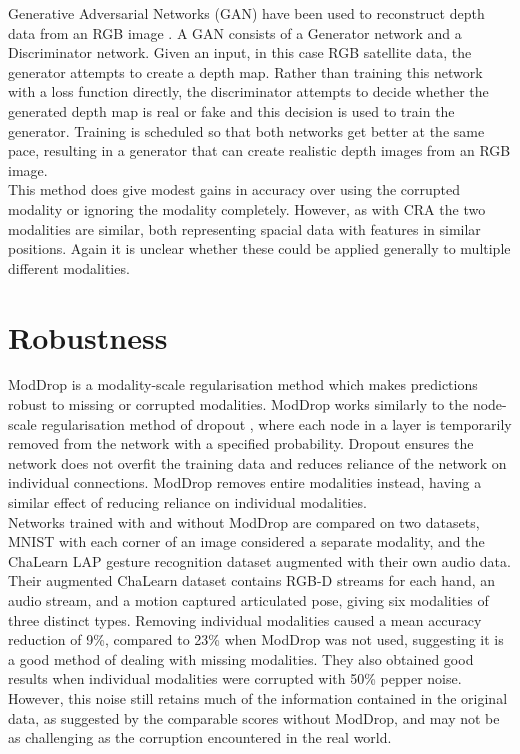 Generative Adversarial Networks (GAN) have been used to reconstruct depth data from an RGB image \cite{GANFootprint}. A GAN consists of a Generator network and a Discriminator network. Given an input, in this case RGB satellite data, the generator attempts to create a depth map. Rather than training this network with a loss function directly, the discriminator attempts to decide whether the generated depth map is real or fake and this decision is used to train the generator. Training is scheduled so that both networks get better at the same pace, resulting in a generator that can create realistic depth images from an RGB image. \\

This method does give modest gains in accuracy over using the corrupted modality or ignoring the modality completely. However, as with CRA the two modalities are similar, both representing spacial data with features in similar positions. Again it is unclear whether these could be applied generally to multiple different modalities.\\

\section{Robustness}
ModDrop \cite{ModDrop} is a modality-scale regularisation method which makes predictions robust to missing or corrupted modalities. ModDrop works similarly to the node-scale regularisation method of dropout \cite{dropout}, where each node in a layer is temporarily removed from the network with a specified probability. Dropout ensures the network does not overfit the training data and reduces reliance of the network on individual connections. ModDrop removes entire modalities instead, having a similar effect of reducing reliance on individual modalities.\\

Networks trained with and without ModDrop are compared on two datasets, MNIST with each corner of an image considered a separate modality, and the ChaLearn LAP gesture recognition dataset augmented with their own audio data. Their augmented ChaLearn dataset contains RGB-D streams for each hand, an audio stream, and a motion captured articulated pose, giving six modalities of three distinct types. Removing individual modalities caused a mean accuracy reduction of 9\%, compared to 23\% when ModDrop was not used, suggesting it is a good method of dealing with missing modalities. They also obtained good results when individual modalities were corrupted with 50\% pepper noise. However, this noise still retains much of the information contained in the original data, as suggested by the comparable scores without ModDrop, and may not be as challenging as the corruption encountered in the real world.\\
